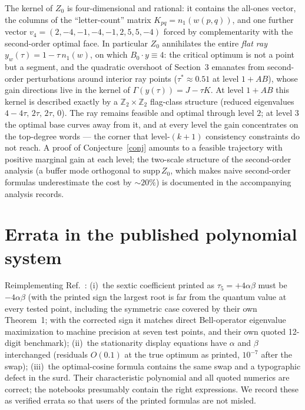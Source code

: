 \documentclass[11pt]{article}
\begin{document}
The kernel of $Z_0$ is four-dimensional and rational: it contains the all-ones
vector, the columns of the ``letter-count'' matrix $K_{pq}=n_1(w(p,q))$, and
one further vector $v_4=(2,-4,-1,-4,-1,2,5,5,-4)$ forced by complementarity
with the second-order optimal face. In particular $Z_0$ annihilates the entire
\emph{flat ray} $y_w(\tau)=1-\tau\,n_1(w)$, on which $B_0\cdot y\equiv4$: the
critical optimum is not a point but a segment, and the quadratic overshoot of
Section~3 emanates from second-order perturbations around interior ray points
($\tau^*\approx0.51$ at level $1{+}AB$), whose gain directions live in the
kernel of $\Gamma(y(\tau))=J-\tau K$. At level $1{+}AB$ this kernel is
described exactly by a $\mathbb Z_2\times\mathbb Z_2$ flag-class structure
(reduced eigenvalues $4-4\tau,\,2\tau,\,2\tau,\,0$). The ray remains feasible
and optimal through level $2$; at level $3$ the optimal base curves away from
it, and at every level the gain concentrates on the top-degree words --- the
corner that level-$(k{+}1)$ consistency constraints do not reach. A proof of
Conjecture~\ref{conj} amounts to a feasible trajectory with positive
marginal gain at each level; the two-scale structure of the second-order
analysis (a buffer mode orthogonal to $\mathrm{supp}\,Z_0$, which makes naive
second-order formulas underestimate the cost by $\sim20\%$) is documented in
the accompanying analysis records.

\section{Errata in the published polynomial system}

Reimplementing Ref.~\cite{Gigena}: (i)~the sextic coefficient printed as
$\tau_5=+4\alpha\beta$ must be $-4\alpha\beta$ (with the printed sign the
largest root is far from the quantum value at every tested point, including
the symmetric case covered by their own Theorem~1; with the corrected sign it
matches direct Bell-operator eigenvalue maximization to machine precision at
seven test points, and their own quoted 12-digit benchmark); (ii)~the
stationarity display equations have $\alpha$ and $\beta$ interchanged
(residuals $O(0.1)$ at the true optimum as printed, $10^{-7}$ after the swap);
(iii)~the optimal-cosine formula contains the same swap and a typographic
defect in the surd. Their characteristic polynomial and all quoted numerics
are correct; the notebooks presumably contain the right expressions. We record
these as verified errata so that users of the printed formulas are not misled.
\end{document}
